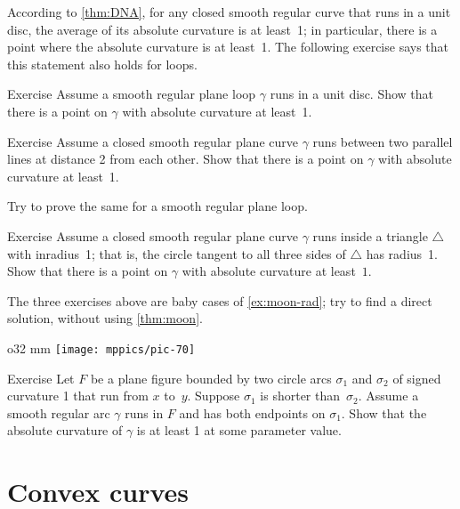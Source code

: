 According to \ref{thm:DNA}, for any closed smooth regular curve that runs in a unit disc, the average of its absolute curvature is at least~1; in particular, there is a point where the absolute curvature is at least~1.
The following exercise says that this statement also holds for loops.

\begin{thm}{Exercise}\label{ex:in-circle}
Assume a smooth regular plane loop $\gamma$ runs in a unit disc.
Show that there is a point on $\gamma$ with absolute curvature at least~1.
\end{thm}


\begin{thm}{Exercise}\label{ex:between-parallels-1}
Assume a closed smooth regular plane curve $\gamma$ runs between two parallel lines at distance 2 from each other.
Show that there is a point on $\gamma$ with absolute curvature at least~1.

Try to prove the same for a smooth regular plane loop.
\end{thm}

\begin{thm}{Exercise}\label{ex:in-triangle}
Assume a closed smooth regular plane curve $\gamma$ runs inside a triangle $\triangle$ with inradius~1; that is, the circle tangent to all three sides of $\triangle$ has radius~1. 
Show that there is a point on $\gamma$ with absolute curvature at least~$1$.
\end{thm}

The three exercises above are baby cases of \ref{ex:moon-rad}; try to find a direct solution, without using \ref{thm:moon}.

{

\begin{wrapfigure}{o}{32 mm}
\vskip-4mm
\centering
\texttt{[image: mppics/pic-70]}
\vskip0mm
\end{wrapfigure}

\begin{thm}{Exercise}\label{ex:lens}
Let $F$ be a plane figure bounded by two circle arcs $\sigma_1$ and $\sigma_2$ of signed curvature 1 that run from $x$ to~$y$.
Suppose $\sigma_1$ is shorter than~$\sigma_2$.
Assume a smooth regular arc $\gamma$ runs in $F$ and has both endpoints on $\sigma_1$.
Show that the absolute curvature of $\gamma$ is at least 1 at some parameter value.

\end{thm}

}

\section{Convex curves}

